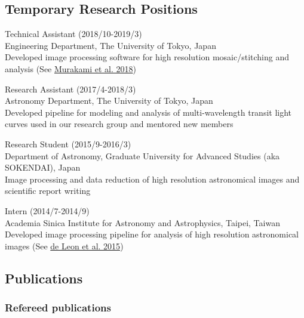 \documentclass[12pt,letterpaper]{article}
\begin{document}
\subsection{Temporary Research Positions}
\begin{list}{}{\cvlist}
    \item Technical Assistant (2018/10-2019/3)\\
          Engineering Department, The University of Tokyo, Japan\\
          Developed image processing software for high resolution mosaic/stitching and analysis (See \href{\spieurl}{Murakami et al. 2018})
    \item Research Assistant (2017/4-2018/3)\\	
          Astronomy Department, The University of Tokyo, Japan\\
          Developed pipeline for modeling and analysis of multi-wavelength transit light curves used in our research group and mentored new members
    \item Research Student (2015/9-2016/3)\\
          Department of Astronomy, Graduate University for Advanced Studies (aka SOKENDAI), Japan\\
          Image processing and data reduction of high resolution astronomical images and scientific report writing
    \item Intern (2014/7-2014/9)\\
          Academia Sinica Institute for Astronomy and Astrophysics, Taipei, Taiwan\\	
          Developed image processing pipeline for analysis of high resolution astronomical images (See \href{\paperone}{de Leon et al. 2015})
\end{list}

%   

\ifdefined\withpubs
  \subsection{Publications}
  

  \subsubsection{Refereed publications}
  \begin{list}{}{\cvlist}
    
  \end{list}
\end{document}
